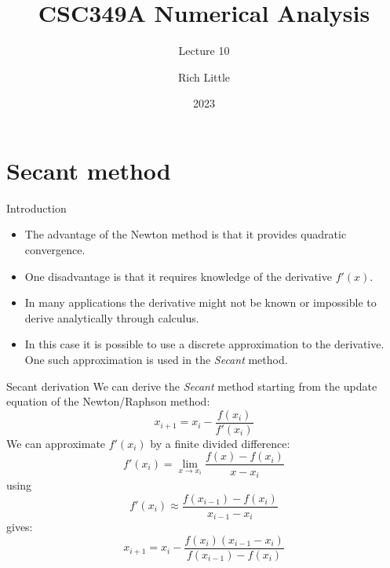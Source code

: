 \documentclass[12pt]{beamer}
\title[CSC349A Numerical Analysis]{CSC349A Numerical Analysis}
\subtitle[Lecture 10]{Lecture 10}
\date[2023]{2023}
\author[R. Little]{Rich Little}
\institute[University of Victoria]{University of Victoria}
\begin{document}
\frame{\maketitle} %




\section{Secant method} 

\begin{frame}{Introduction}
\begin{itemize}
\item{The advantage of the Newton method is that it provides quadratic
convergence.}
\item{One disadvantage is that it requires knowledge of the
derivative $f'(x)$.}
\item{In many applications the derivative might not be
known or impossible to derive analytically through calculus.}
\item{In this case it is possible to use a discrete approximation to the
derivative. One such approximation is used in the {\it Secant}
method.}
\end{itemize}
\end{frame}

\begin{frame}{Secant derivation} 
We can derive the {\it Secant} method starting from the update
equation of the Newton/Raphson method: 
\[
x_{i+1} = x_i - \frac{f(x_i)}{f'(x_i)}
\]
\noindent 
We can approximate $f'(x_i)$ by a finite divided difference: 
\[
f'(x_i) = \lim_{x \rightarrow x_i} \frac{f(x)-f(x_i)}{x-x_i} 
\]
\noindent 
using 
\[
f'(x_i) \approx \frac{f(x_{i-1})-f(x_i)}{x_{i-1} - x_i}
\]
\noindent 
gives: 
\[
x_{i+1} = x_i - \frac{f(x_i)(x_{i-1}-x_i)}{f(x_{i-1}) - f(x_{i})}
\]

\end{frame} 
\end{document}
